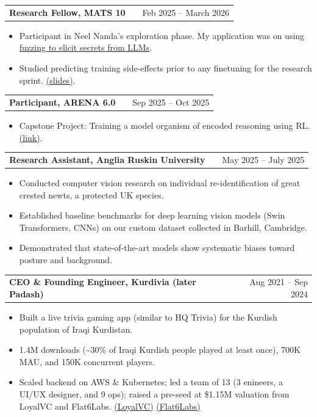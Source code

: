 \documentclass[a4paper,12pt]{article}
\makeatletter
\newenvironment{joblong}[2]
    {
    \begin{tabularx}{\linewidth}{@{}l X r@{}}
    \textbf{#1} & \hfill &  #2 \\[3.75pt]
    \end{tabularx}
    \begin{minipage}[t]{\linewidth}
    \begin{itemize}[nosep,after=\strut, leftmargin=1em, itemsep=3pt,label=--]
    }
    {
    \end{itemize}
    \end{minipage}    
    }
\makeatother
\begin{document}
\begin{joblong}{Research Fellow, MATS 10}{Feb 2025 -- March 2026}

\item Participant in Neel Nanda's exploration phase. My application was on using \href{https://docs.google.com/document/d/1tSvYjPoSsTlqQHLGw_6yTE75XG0HlhDrYFMUWBBFybU/edit?tab=t.0#heading=h.svoh91ias2y7}{fuzzing to elicit secrets from LLMs}.
\item Studied predicting training side-effects prior to any finetuning for the research sprint. \href{https://docs.google.com/presentation/d/1QBw1AKbvHidJ2vwtVnFKUK5mQmkKuodeJ8YRqNM7M9w/edit}{(slides)}.

\end{joblong}

\begin{joblong}{Participant, ARENA 6.0}{Sep 2025 -- Oct 2025}

\item Capstone Project: Training a model organism of encoded reasoning using RL. \href{https://www.lesswrong.com/posts/uznhavfcivA8vojMS/an-arena-6-0-capstone-model-organism-of-encoded-reasoning}{(link)}.

\end{joblong}

\begin{joblong}{Research Assistant, Anglia Ruskin University}{May 2025 -- July 2025}

\item Conducted computer vision research on individual re-identification of great crested newts, a protected UK species.
\item Established baseline benchmarks for deep learning vision models (Swin Transformers, CNNs) on our custom dataset collected in Barhill, Cambridge.
\item Demonstrated that state-of-the-art models show systematic biases toward posture and background.

\end{joblong}

\begin{joblong}{CEO \& Founding Engineer, Kurdivia (later Padash)}{Aug 2021 -- Sep 2024}
\item Built a live trivia gaming app (similar to HQ Trivia) for the Kurdish population of Iraqi Kurdistan.
\item 1.4M downloads (\textasciitilde30\% of Iraqi Kurdish people played at least once), 700K MAU, and 150K concurrent players.
\item Scaled backend on AWS \& Kubernetes; led a team of 13 (3 enineers, a UI/UX designer, and 9 ops); raised a pre-seed at \$1.15M valuation from LoyalVC and Flat6Labs. \href{https://www.loyal.vc/portfolio/padash}{(LoyalVC)} \href{https://www.flat6labs.com/Company/padash/}{(Flat6Labs)}
\end{joblong}
\end{document}
